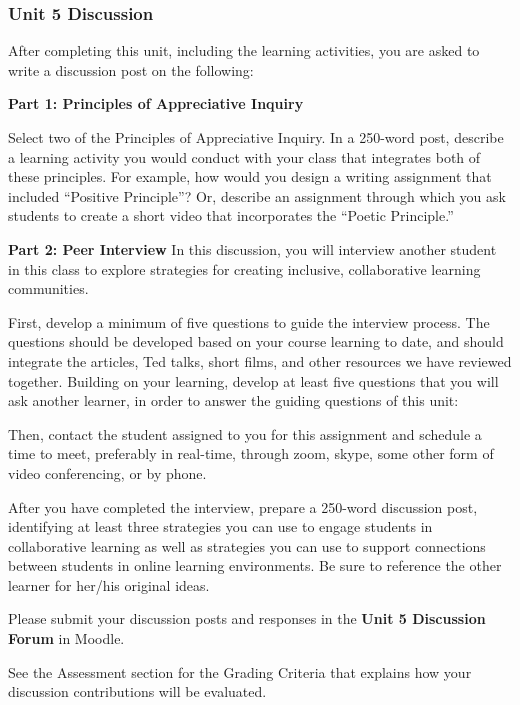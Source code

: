 \documentclass[
]{book}
\providecommand{\tightlist}{%
  \setlength{\itemsep}{0pt}\setlength{\parskip}{0pt}}
\begin{document}
\begin{assessment}
\hypertarget{unit-5-discussion}{%
\subsubsection{Unit 5 Discussion}\label{unit-5-discussion}}

After completing this unit, including the learning activities, you are
asked to write a discussion post on the following:

\textbf{Part 1: Principles of Appreciative Inquiry}

Select two of the Principles of Appreciative Inquiry. In a 250-word
post, describe a learning activity you would conduct with your class
that integrates both of these principles. For example, how would you
design a writing assignment that included ``Positive Principle''? Or,
describe an assignment through which you ask students to create a short
video that incorporates the ``Poetic Principle.''

\textbf{Part 2: Peer Interview} In this discussion, you will interview
another student in this class to explore strategies for creating
inclusive, collaborative learning communities.

First, develop a minimum of five questions to guide the interview
process. The questions should be developed based on your course learning
to date, and should integrate the articles, Ted talks, short films, and
other resources we have reviewed together. Building on your learning,
develop at least five questions that you will ask another learner, in
order to answer the guiding questions of this unit:


Then, contact the student assigned to you for this assignment and
schedule a time to meet, preferably in real-time, through zoom, skype,
some other form of video conferencing, or by phone.

After you have completed the interview, prepare a 250-word discussion
post, identifying at least three strategies you can use to engage
students in collaborative learning as well as strategies you can use to
support connections between students in online learning environments. Be
sure to reference the other learner for her/his original ideas.

Please submit your discussion posts and responses in the \textbf{Unit 5
Discussion Forum} in Moodle.

See the Assessment section for the Grading Criteria that explains how
your discussion contributions will be evaluated.
\end{assessment}
\end{document}
